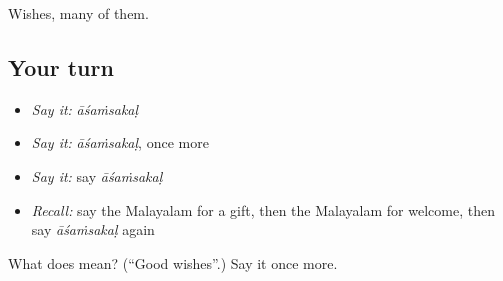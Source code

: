 \begin{grammarlens}[title={What you've built}]
Wishes, many of them.
\end{grammarlens}

\subsection*{Your turn}
\begin{itemize}
\raggedright
  \item \emph{Say it:} \emph{āśaṁsakaḷ}
  \item \emph{Say it:} \emph{āśaṁsakaḷ}, once more
  \item \emph{Say it:} say \emph{āśaṁsakaḷ}
  \item \emph{Recall:} say the Malayalam for a gift, then the Malayalam for welcome, then say \emph{āśaṁsakaḷ} again
\end{itemize}

\begin{tcolorbox}[breakable,colback=teal!4,colframe=teal!35!black,title={Before you move on}]
What does  mean? (\textquotedblleft{}Good wishes\textquotedblright{}.) Say it once more.
\end{tcolorbox}
